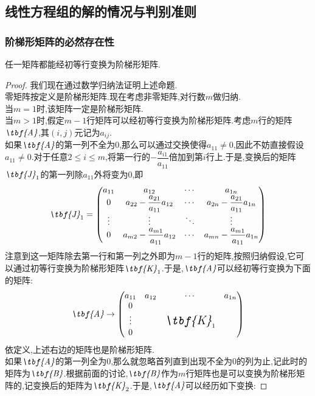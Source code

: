 \documentclass{ctexart}
\begin{document}
\subsection{线性方程组的解的情况与判别准则}
\subsubsection{阶梯形矩阵的必然存在性}
\begin{theorem}[阶梯形矩阵的必然存在性]
    任一矩阵都能经初等行变换为阶梯形矩阵.
\end{theorem}
\begin{proof}
    我们现在通过数学归纳法证明上述命题.\\
    零矩阵按定义是阶梯形矩阵.现在考虑非零矩阵,对行数$m$做归纳.\\
    当$m=1$时,该矩阵一定是阶梯形矩阵.\\
    当$m>1$时,假定$m-1$行矩阵可以经初等行变换为阶梯形矩阵.考虑$m$行的矩阵$\textit{\tbf{A}}$,其$(i,j)$元记为$a_{ij}$.\\
    如果$\textit{\tbf{A}}$的第一列不全为$0$,那么可以通过交换使得$a_{11}\neq0$,因此不妨直接假设$a_{11}\neq0$.对于任意$2\leqslant i\leqslant m$,将第一行的$-\dfrac{a_{i1}}{a_{11}}$倍加到第$i$行上.于是,变换后的矩阵$\textit{\tbf{J}}_1$的第一列除$a_{11}$外将变为$0$,即
    \[\textit{\tbf{J}}_1=\begin{pmatrix}
        a_{11}&a_{12}&\cdots&a_{1n}\\
        0&a_{22}-\dfrac{a_{21}}{a_{11}}a_{12}&\cdots&a_{2n}-\dfrac{a_{21}}{a_{11}}a_{1n}\\
        \vdots&\vdots&\ddots&\vdots\\
        0&a_{m2}-\dfrac{a_{m1}}{a_{11}}a_{12}&\cdots&a_{mn}-\dfrac{a_{m1}}{a_{11}}a_{1n}
    \end{pmatrix}\]
    注意到这一矩阵除去第一行和第一列之外即为$m-1$行的矩阵,按照归纳假设,它可以通过初等行变换为阶梯形矩阵$\textit{\tbf{K}}_1$.于是,$\textit{\tbf{A}}$可以经初等行变换为下面的矩阵:
    \[\textit{\tbf{A}}\rightarrow\begin{pmatrix}
        a_{11}&a_{12}&\cdots&a_{1n}\\
        0&&&\\
        \vdots&&\Large{\textit{\tbf{K}}_1}&\\
        0&&&
    \end{pmatrix}\]
    依定义,上述右边的矩阵也是阶梯形矩阵.\\
    如果$\textit{\tbf{A}}$的第一列全为$0$,那么就忽略首列直到出现不全为$0$的列为止,记此时的矩阵为$\textit{\tbf{B}}$.根据前面的讨论,$\textit{\tbf{B}}$作为$m$行矩阵也是可以变换为阶梯形矩阵的,记变换后的矩阵为$\textit{\tbf{K}}_2$.于是,$\textit{\tbf{A}}$可以经历如下变换:

\end{proof}
\end{document}
